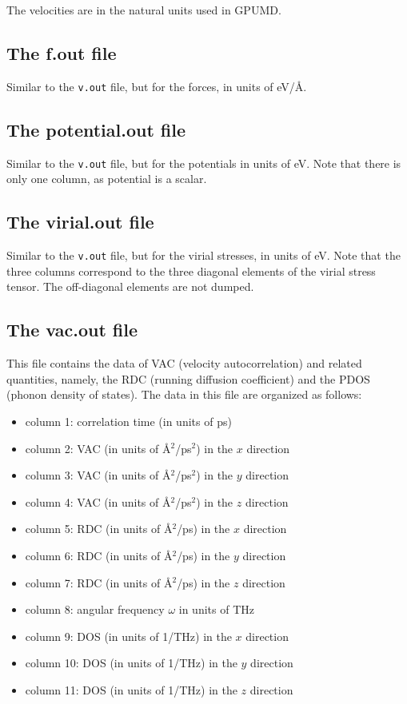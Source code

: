 \documentclass[12pt,a4paper]{report}
\begin{document}
The velocities are in the natural units used in GPUMD.

\subsection{The f.out file}

Similar to the \verb"v.out" file, but for the forces, in units of eV/\AA.

\subsection{The potential.out file}

Similar to the \verb"v.out" file, but for the potentials in units of eV. Note that there is
only one column, as potential is a scalar.

\subsection{The virial.out file}

Similar to the \verb"v.out" file, but for the virial stresses, in units of eV.
Note that the three columns correspond to the three diagonal elements
of the virial stress tensor. The off-diagonal elements are not dumped.

\subsection{The vac.out file}
This file contains the data of VAC (velocity autocorrelation) and related quantities, namely, the RDC (running diffusion coefficient) and the PDOS (phonon density of states). The data in this file are organized as follows:
\begin{itemize}
\item column 1: correlation time (in units of ps)
\item column 2: VAC (in units of \AA$^2$/ps$^2$) in the $x$ direction
\item column 3: VAC (in units of \AA$^2$/ps$^2$) in the $y$ direction
\item column 4: VAC (in units of \AA$^2$/ps$^2$) in the $z$ direction
\item column 5: RDC (in units of \AA$^2$/ps) in the $x$ direction
\item column 6: RDC (in units of \AA$^2$/ps) in the $y$ direction
\item column 7: RDC (in units of \AA$^2$/ps) in the $z$ direction
\item column 8: angular frequency $\omega$ in units of THz
\item column 9: DOS (in units of 1/THz) in the $x$ direction
\item column 10: DOS (in units of 1/THz) in the $y$ direction
\item column 11: DOS (in units of 1/THz) in the $z$ direction
\end{itemize}
\end{document}
